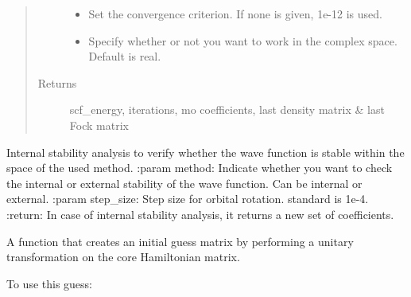 \documentclass[letterpaper,10pt,english]{sphinxmanual}
\begin{document}
\begin{fulllineitems}
\begin{fulllineitems}
\begin{quote}
\begin{description}
\begin{itemize}
\item {} 
 \textendash{} Set the convergence criterion. If none is given, 1e-12 is used.

\item {} 
 \textendash{} Specify whether or not you want to work in the complex space. Default is real.

\end{itemize}

\item[{Returns}] \leavevmode
scf\_energy, iterations, mo coefficients, last density matrix \& last Fock matrix

\end{description}\end{quote}

\end{fulllineitems}


\begin{fulllineitems}
\label{\detokenize{GHF:hf.HartreeFock.GHF.MF.stability_analysis}}
Internal stability analysis to verify whether the wave function is stable within the space of the used method.
:param method: Indicate whether you want to check the internal or external stability of the wave function. Can
be internal or external.
:param step\_size: Step size for orbital rotation. standard is 1e-4.
:return: In case of internal stability analysis, it returns a new set of coefficients.

\end{fulllineitems}


\begin{fulllineitems}
\label{\detokenize{GHF:hf.HartreeFock.GHF.MF.unitary_rotation_guess}}
A function that creates an initial guess matrix by performing a unitary transformation on the core Hamiltonian
matrix.

To use this guess:


\end{fulllineitems}
\end{fulllineitems}
\end{document}
